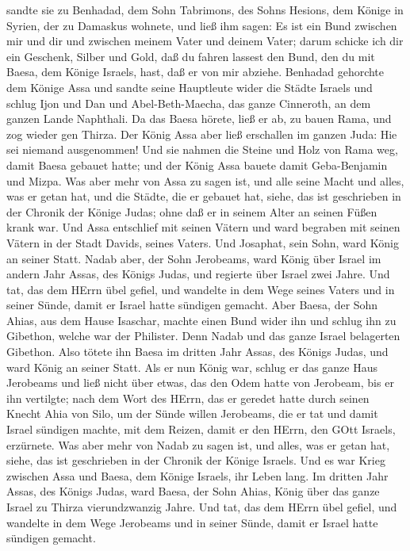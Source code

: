 sandte sie zu Benhadad, dem Sohn Tabrimons, des Sohns Hesions, dem
Könige in Syrien, der zu Damaskus wohnete, und ließ ihm sagen:
 Es ist ein Bund zwischen mir und dir und zwischen meinem
Vater und deinem Vater; darum schicke ich dir ein Geschenk, Silber und
Gold, daß du fahren lassest den Bund, den du mit Baesa, dem Könige
Israels, hast, daß er von mir abziehe.  Benhadad gehorchte
dem Könige Assa und sandte seine Hauptleute wider die Städte Israels und
schlug Ijon und Dan und Abel-Beth-Maecha, das ganze Cinneroth, an dem
ganzen Lande Naphthali.  Da das Baesa hörete, ließ er ab,
zu bauen Rama, und zog wieder gen Thirza.  Der König Assa
aber ließ erschallen im ganzen Juda: Hie sei niemand ausgenommen! Und
sie nahmen die Steine und Holz von Rama weg, damit Baesa gebauet hatte;
und der König Assa bauete damit Geba-Benjamin und Mizpa. 
Was aber mehr von Assa zu sagen ist, und alle seine Macht und alles, was
er getan hat, und die Städte, die er gebauet hat, siehe, das ist
geschrieben in der Chronik der Könige Judas; ohne daß er in seinem Alter
an seinen Füßen krank war.  Und Assa entschlief mit seinen
Vätern und ward begraben mit seinen Vätern in der Stadt Davids, seines
Vaters. Und Josaphat, sein Sohn, ward König an seiner Statt.
 Nadab aber, der Sohn Jerobeams, ward König über Israel im
andern Jahr Assas, des Königs Judas, und regierte über Israel zwei
Jahre.  Und tat, das dem HErrn übel gefiel, und wandelte in
dem Wege seines Vaters und in seiner Sünde, damit er Israel hatte
sündigen gemacht.  Aber Baesa, der Sohn Ahias, aus dem
Hause Isaschar, machte einen Bund wider ihn und schlug ihn zu Gibethon,
welche war der Philister. Denn Nadab und das ganze Israel belagerten
Gibethon.  Also tötete ihn Baesa im dritten Jahr Assas, des
Königs Judas, und ward König an seiner Statt.  Als er nun
König war, schlug er das ganze Haus Jerobeams und ließ nicht über etwas,
das den Odem hatte von Jerobeam, bis er ihn vertilgte; nach dem Wort des
HErrn, das er geredet hatte durch seinen Knecht Ahia von Silo,
 um der Sünde willen Jerobeams, die er tat und damit Israel
sündigen machte, mit dem Reizen, damit er den HErrn, den GOtt Israels,
erzürnete.  Was aber mehr von Nadab zu sagen ist, und
alles, was er getan hat, siehe, das ist geschrieben in der Chronik der
Könige Israels.  Und es war Krieg zwischen Assa und Baesa,
dem Könige Israels, ihr Leben lang.  Im dritten Jahr Assas,
des Königs Judas, ward Baesa, der Sohn Ahias, König über das ganze
Israel zu Thirza vierundzwanzig Jahre.  Und tat, das dem
HErrn übel gefiel, und wandelte in dem Wege Jerobeams und in seiner
Sünde, damit er Israel hatte sündigen gemacht.

